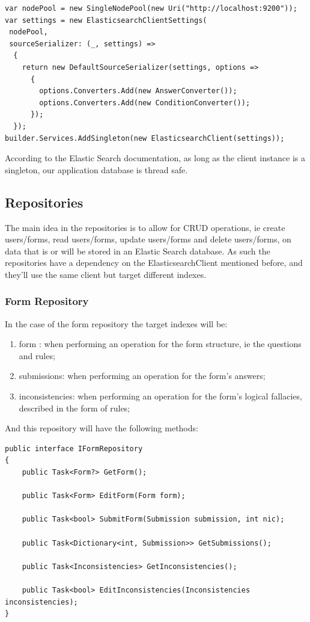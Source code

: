 \begin{lstlisting}[style=sharpc]
var nodePool = new SingleNodePool(new Uri("http://localhost:9200"));
var settings = new ElasticsearchClientSettings(
 nodePool,
 sourceSerializer: (_, settings) =>
  {
    return new DefaultSourceSerializer(settings, options =>
      {
        options.Converters.Add(new AnswerConverter());
        options.Converters.Add(new ConditionConverter());
      });
  });
builder.Services.AddSingleton(new ElasticsearchClient(settings));
\end{lstlisting}

According to the Elastic Search documentation, as long as the client instance is a singleton, our application database is thread safe.
\pagebreak

\subsection{Repositories}

The main idea in the repositories is to allow for CRUD operations, ie create users/forms, read users/forms, update users/forms and delete users/forms, on data that is or will be stored in an Elastic Search database. As such the repositories have a dependency on the ElasticsearchClient mentioned before, and they'll use the same client but target different indexes.

\subsubsection{Form Repository}

In the case of the form repository the target indexes will be:

\begin{enumerate}
	\item form : when performing an operation for the form structure, ie the questions and rules;
	\item submissions: when performing an operation for the form's answers;
	\item inconsistencies: when performing an operation for the form's logical fallacies, described in the form of rules;
\end{enumerate}

And this repository will have the following methods:

\begin{lstlisting}[style=sharpc]
public interface IFormRepository
{
	public Task<Form?> GetForm();
		
	public Task<Form> EditForm(Form form);
		
	public Task<bool> SubmitForm(Submission submission, int nic);
		
	public Task<Dictionary<int, Submission>> GetSubmissions();
		
	public Task<Inconsistencies> GetInconsistencies();
		
	public Task<bool> EditInconsistencies(Inconsistencies inconsistencies);
}
\end{lstlisting}

